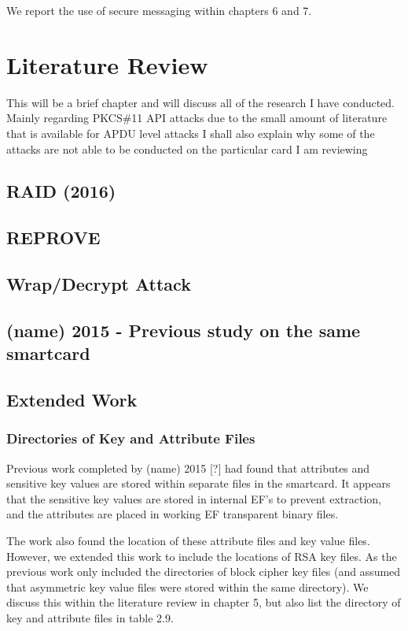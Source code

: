 \documentclass[bsc,frontabs,twoside,singlespacing,parskip,deptreport]{infthesis}     %
\begin{document}
We report the use of secure messaging within chapters 6 and 7.


\chapter{Literature Review}

This will be a brief chapter and will discuss all of the research I have conducted.\\
Mainly regarding PKCS\#11 API attacks due to the small amount of literature that is available for APDU level attacks
I shall also explain why some of the attacks are not able to be conducted on the particular card I am reviewing
\section{RAID (2016)}

\section{REPROVE}

\section{Wrap/Decrypt Attack}
\section{(name) 2015 - Previous study on the same smartcard}
\section{Extended Work}
\subsection{Directories of Key and Attribute Files}
Previous work completed by (name) 2015 [?] had found that attributes and sensitive key values are stored within separate files in the smartcard. It appears that the sensitive key values are stored in internal EF's to prevent extraction, and the attributes are placed in working EF transparent binary files. 

The work also found the location of these attribute files and key value files. However, we extended this work to include the locations of RSA key files. As the previous work only included the directories of block cipher key files (and assumed that asymmetric key value files were stored within the same directory). We discuss this within the literature review in chapter 5, but also list the directory of key and attribute files in table 2.9.
\end{document}
